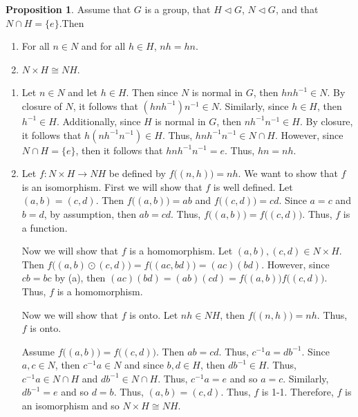 \documentclass{article}
\makeatletter
\theoremstyle{definition}
\newtheorem{prop}{Proposition}[section]
\theoremstyle{remark}
\let\oldproofname=\proofname
\renewcommand{\proofname}{\bf{\textit{\oldproofname}}}
\theoremstyle{definition}
\renewenvironment{proof}[1][\proofname]{\par
  \pushQED{\qed}%
  \normalfont \topsep6\p@\@plus6\p@\relax
  \list{}{\leftmargin=0mm
          \rightmargin=0mm
          \settowidth{\itemindent}{\itshape#1}%
          \labelwidth=4mm
          \parsep=0pt \listparindent=0mm%
  }
  \item[\hskip\labelsep
        \itshape
    #1\@addpunct{.}]\ignorespaces
}{%
  \popQED\endlist\@endpefalse
}
\makeatother
\begin{document}
    \begin{prop}\label{prop:1.12}
        Assume that $G$ is a group, that $H\triangleleft G$, $N\triangleleft G$, and that $N\cap H=\{e\}$.Then 
        \begin{enumerate}[label=(\roman*)]
            \item For all $n\in N$ and for all $h\in H$, $nh=hn$.
            \item $N\times H\cong NH$.
        \end{enumerate}
    \end{prop}
        \begin{proof}\hfill\par
            \begin{enumerate}[label=(\roman*)]
                \item Let $n\in N$ and let $h\in H$. Then since $N$ is normal in $G$, then $hnh^{-1}\in N$. By closure of $N$, it follows that $(hnh^{-1})n^{-1}\in N$. Similarly, since $h\in H$, then $h^{-1}\in H$. Additionally, since $H$ is normal in $G$, then $nh^{-1}n^{-1}\in H$. By closure, it follows that $h(nh^{-1}n^{-1})\in H$. Thus, $hnh^{-1}n^{-1}\in N\cap H$. However, since $N\cap H=\{e\}$, then it follows that $hnh^{-1}n^{-1}=e$. Thus, $hn=nh$.
                \item Let $f\colon N\times H\rightarrow NH$ be defined by $f\big((n,h)\big)=nh$. We want to show that $f$ is an isomorphism. First we will show that $f$ is well defined. Let $(a,b)=(c,d)$. Then $f\big((a,b)\big)=ab$ and $f\big((c,d)\big)=cd$. Since $a=c$ and $b=d$, by assumption, then $ab=cd$. Thus, $f\big((a,b)\big)=f\big((c,d)\big)$. Thus, $f$ is a function.\par Now we will show that $f$ is a homomorphism. Let $(a,b),(c,d)\in N\times H$. Then $f\big((a,b)\odot(c,d)\big)=f\big((ac,bd)\big)=(ac)(bd)$. However, since $cb=bc$ by (a), then $(ac)(bd)=(ab)(cd)=f\big((a,b)\big)f\big((c,d)\big)$. Thus, $f$ is a homomorphism.\par\hspace{4mm}Now we will show that $f$ is onto. Let $nh\in NH$, then $f\big((n,h)\big)=nh$. Thus, $f$ is onto.\par\hspace{4mm} Assume $f\big((a,b)\big)=f\big((c,d)\big)$. Then $ab=cd$. Thus, $c^{-1}a=db^{-1}$. Since $a,c\in N$, then $c^{-1}a\in N$ and since $b,d\in H$, then $db^{-1}\in H$. Thus, $c^{-1}a\in N\cap H$ and $db^{-1}\in N\cap H$. Thus, $c^{-1}a= e$ and so $a=c$. Similarly, $db^{-1}=e$ and so $d=b$. Thus, $(a,b)=(c,d)$. Thus, $f$ is 1-1. Therefore, $f$ is an isomorphism and so $N\times H\cong NH$.
            \end{enumerate}
        \end{proof}
        
\end{document}

